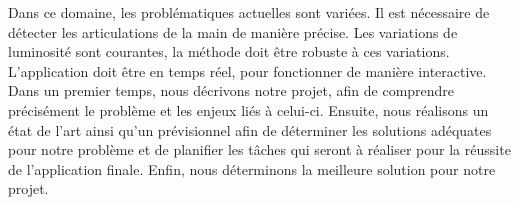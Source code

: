 Dans ce domaine, les problématiques actuelles sont variées. Il est 
nécessaire de détecter les articulations de la main de manière précise. 
Les variations de luminosité sont courantes, la méthode doit être robuste 
à ces variations. L'application doit être en temps réel, pour fonctionner de 
manière interactive.\\

Dans un premier temps, nous décrivons notre projet, afin de comprendre 
précisément le problème et les enjeux liés à celui-ci. Ensuite, nous 
réalisons un état de l'art ainsi qu'un prévisionnel afin de déterminer 
les solutions adéquates pour notre problème et de planifier les tâches 
qui seront à réaliser pour la réussite de l'application finale. Enfin, nous déterminons la meilleure solution pour notre projet.\\
